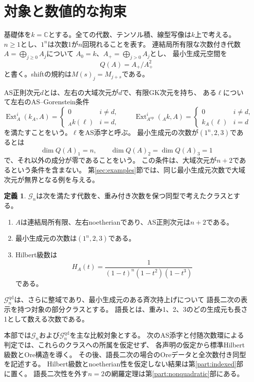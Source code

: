 \documentclass[11pt,a4paper]{ltjsarticle}
\theoremstyle{definition}
\newtheorem{definition}[theorem]{定義}
\newcommand{\Ext}{\operatorname{Ext}}
\newcommand{\Gclass}{\mathcal G}
\begin{document}
\section{対象と数値的な拘束}\label{sec:scope-numerical}
基礎体を$k=\mathbb C$とする。全ての代数、テンソル積、線型写像は$k$上で考える。
$n\geq1$とし、$1^n$は次数1が$n$回現れることを表す。
連結局所有限な次数付き代数$A=\bigoplus_{j\geq0}A_j$について
$A_0=k$、$A_+=\bigoplus_{j>0}A_j$とし、
最小生成元空間を
\[
Q(A)=A_+/A_+^2
\]
と書く。shiftの規約は$M(s)_j=M_{j+s}$である。

AS正則次元$d$とは、左右の大域次元が$d$で、有限GK次元を持ち、
ある$\ell$について左右のAS--Gorenstein条件
\[
\Ext_A^i(k_A,A)=
\begin{cases}0&i\ne d,\\ {}_Ak(\ell)&i=d,\end{cases}
\qquad
\Ext_{A^{\mathrm{op}}}^i({}_Ak,A)=
\begin{cases}0&i\ne d,\\ k_A(\ell)&i=d\end{cases}
\]
を満たすことをいう。$\ell$をAS添字と呼ぶ。
最小生成元の次数が$(1^n,2,3)$であるとは
\[
\dim Q(A)_1=n,\qquad \dim Q(A)_2=\dim Q(A)_3=1
\]
で、それ以外の成分が零であることをいう。
この条件は、大域次元が$n+2$であるという条件を含まない。
第\ref{sec:examples}節では、同じ最小生成元次数で大域次元が無界となる例を与える。

\begin{definition}\label{def:general-class}
$\Gclass_n$は次を満たす代数を、重み付き次数を保つ同型で考えたクラスとする。
\begin{enumerate}
\item $A$は連結局所有限、左右noetherianであり、AS正則次元は$n+2$である。
\item 最小生成元の次数は$(1^n,2,3)$である。
\item Hilbert級数は
\begin{equation}\label{eq:general-target-hilbert}
H_A(t)=\frac1{(1-t)^n(1-t^2)(1-t^3)}
\end{equation}
である。
\end{enumerate}
$\Gclass_n^{\mathrm{qd}}$は、さらに整域であり、最小生成元のある斉次持上げについて
語長二次の表示を持つ対象の部分クラスとする。
語長とは、重み1、2、3のどの生成元も長さ1として数える次数である。
\end{definition}

本部では$\mathcal G_n$および$\mathcal G_n^{\mathrm{qd}}$を主な比較対象とする。
次のAS添字と付随次数環による判定では、これらのクラスへの所属を仮定せず、
各声明の仮定から標準Hilbert級数とOre構造を導く。
その後、語長二次の場合のOreデータと全次数付き同型を記述する。
Hilbert級数とnoetherian性を仮定しない結果は第\ref{part:indexed}部に置く。
語長二次性を外す$n=2$の網羅定理は第\ref{part:nonquadratic}部にある。
\end{document}
